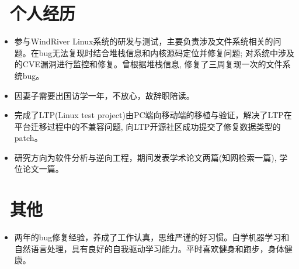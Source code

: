 \documentclass[10pt]{resume}
\begin{document}
\section{\faUsers\ 个人经历}\normalsize
{}
\begin{itemize}
\item {参与WindRiver Linux系统的研发与测试，主要负责涉及文件系统相关的问题。在bug无法复现时结合堆栈信息和内核源码定位并修复问题; 对系统中涉及的CVE漏洞进行监控和修复。曾根据堆栈信息, 修复了三周复现一次的文件系统bug。}
 \item {因妻子需要出国访学一年，不放心，故辞职陪读。}
\end{itemize}
\begin{itemize}
\item {完成了LTP(Linux test project)由PC端向移动端的移植与验证，解决了LTP在平台迁移过程中的不兼容问题, 向LTP开源社区成功提交了修复数据类型的patch。}
\end{itemize}
\begin{itemize}
\item {研究方向为软件分析与逆向工程，期间发表学术论文两篇(知网检索一篇), 学位论文一篇。}
\end{itemize}

\vspace{1ex}
\section{\faInfo\ 其他}
\begin{itemize}\normalsize
  \item {两年的bug修复经验，养成了工作认真，思维严谨的好习惯。自学机器学习和自然语言处理，具有良好的自我驱动学习能力。平时喜欢健身和跑步，身体健康。}
  \end{itemize}
  
\end{document}
